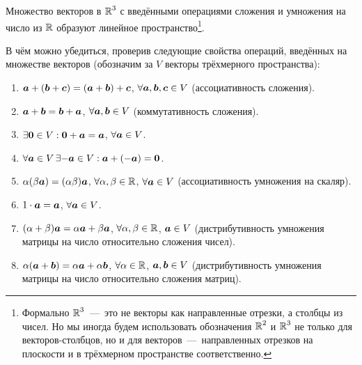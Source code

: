 \documentclass[a4paper,12pt]{article}
\begin{document}
  Множество векторов в $\operatorname{\mathbb R}^3$ с введёнными операциями сложения и умножения на число из $\operatorname{\mathbb R}$ образуют линейное пространство\footnote{Формально $\operatorname{\mathbb R}^3$~---~это не векторы как направленные отрезки, а столбцы из чисел. Но мы иногда будем использовать обозначения $\operatorname{\mathbb R}^2$ и $\operatorname{\mathbb R}^3$ не только для векторов-столбцов, но и для векторов~---~направленных отрезков на плоскости и в трёхмерном пространстве соответственно.}.
  
  \begin{remark}
    В чём можно убедиться, проверив следующие свойства операций, введённых на множестве векторов (обозначим за $V$ векторы трёхмерного пространства):
    \begin{enumerate}
      \item $\boldsymbol a + (\boldsymbol b + \boldsymbol c) = (\boldsymbol a + \boldsymbol b) + \boldsymbol c$, $\forall \boldsymbol a, \boldsymbol b, \boldsymbol c \in V$ (ассоциативность сложения).
      \item $\boldsymbol a + \boldsymbol b = \boldsymbol b + \boldsymbol a$, $\forall \boldsymbol a, \boldsymbol b \in V$ (коммутативность сложения).
      \item $\exists \boldsymbol 0 \in V: \boldsymbol 0 + \boldsymbol a = \boldsymbol a$, $\forall \bds a \hm\in V$.
      \item $\forall \boldsymbol a \in V\, \exists {-\boldsymbol a} \in V: \boldsymbol a + ({-\boldsymbol a}) = \boldsymbol 0$.
      \item $\alpha (\beta \boldsymbol a) = (\alpha \beta) \boldsymbol a$, $\forall \alpha, \beta \in \operatorname{\mathbb R}$, $\forall \bds a \hm\in V$ (ассоциативность умножения на скаляр).
      \item $1 \cdot \boldsymbol a = \boldsymbol a$, $\forall \boldsymbol a \in V$.
      \item $(\alpha + \beta) \boldsymbol a = \alpha \boldsymbol a + \beta \boldsymbol a$, $\forall \alpha, \beta \hm\in \RR$, $\bds a \hm\in V$ (дистрибутивность умножения матрицы на число относительно сложения чисел).
      \item $\alpha (\boldsymbol a + \boldsymbol b) = \alpha \boldsymbol a + \alpha \boldsymbol b$, $\forall \alpha \hm\in \RR$, $\bds a, \bds b \hm\in V$ (дистрибутивность умножения матрицы на число относительно сложения матриц).
    \end{enumerate}
  \end{remark}
  
\end{document}
